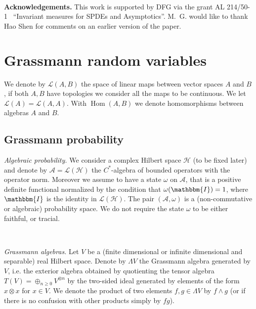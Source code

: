 \documentclass[11pt]{article}
\newcommand{\tmop}[1]{\ensuremath{\operatorname{#1}}}
\newcommand{\tmtextbf}[1]{{\bfseries{#1}}}
\newcommand{\tmtextit}[1]{{\itshape{#1}}}
\begin{document}
\

{\noindent}\tmtextbf{Acknowledgements.} This work is supported by DFG via the
grant AL 214/50-1 \ ``Invariant measures for SPDEs and Asymptotics''. M.~G.
would like to thank Hao Shen for comments on an earlier version of the paper.

\section{Grassmann random variables}\label{sec:grassmann-rv}

We denote by $\mathcal{L} (A, B)$ the space of linear maps between vector
spaces $A$ and $B$, if both $A, B$ have topologies we consider all the maps to
be continuous. We let $\mathcal{L} (A) =\mathcal{L} (A, A)$. With $\tmop{Hom}
(A, B)$ we denote homomorphisms between algebras $A$ and $B$.

\subsection{Grassmann probability}\label{sec:prob}

\tmtextit{Algebraic probability.} We consider a complex Hilbert space
$\mathcal{H}$ (to be fixed later) and denote by $\mathcal{A}=\mathcal{L}
(\mathcal{H})$ the $C^{\ast}$-algebra of bounded operators with the operator
norm. Moreover we assume to have a state $\omega$ on $\mathcal{A}$, that is a
positive definite functional normalized by the condition that $\omega
(\mathbbm{I}) = 1$, where $\mathbbm{I}$ is the identity in $\mathcal{L}
(\mathcal{H})$. The pair $(\mathcal{A}, \omega)$ is a (non-commutative or
algebraic) probability space. We do not require the state $\omega$ to be
either faithful, or tracial.

\

\tmtextit{Grassmann algebras.} Let $V$ be a (finite dimensional or infinite
dimensional and separable) real Hilbert space. Denote by $\Lambda V$ the
Grassmann algebra generated by $V$, i.e. the exterior algebra obtained by
quotienting the tensor algebra $T (V) = \oplus_{n \geqslant 0} V^{\otimes n}$
by the two-sided ideal generated by elements of the form $x \otimes x$ for $x
\in V$. We denote the product of two elements $f, g \in \Lambda V$ by $f
\wedge g$ (or if there is no confusion with other products simply by $f g$).

\
\end{document}
